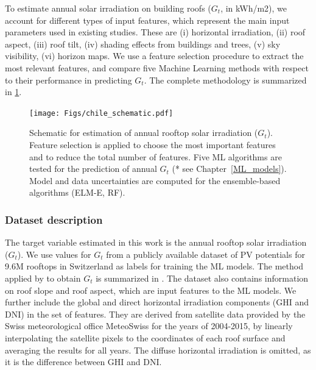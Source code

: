 To estimate annual solar irradiation on building roofs ($G_t$, in kWh/m2), we account for different types of input features, which represent the main input parameters used in existing studies. These are (i) horizontal irradiation, (ii) roof aspect, (iii) roof tilt, (iv) shading effects from buildings and trees, (v) sky visibility, (vi) horizon maps. We use a feature selection procedure to extract the most relevant features, and compare five Machine Learning methods with respect to their performance in predicting $G_t$. The complete methodology is summarized in \ref{fig:chile_schema}.

\begin{figure}[tb]
\centering\texttt{[image: Figs/chile\_schematic.pdf]}
\caption{Schematic for estimation of annual rooftop solar irradiation ($G_t$). Feature selection is applied to choose the most important features and to reduce the total number of features. Five ML algorithms are tested for the prediction of annual $G_t$ (* see Chapter~\ref{ML_models}). Model and data uncertainties are computed for the ensemble-based algorithms (ELM-E, RF). }
\label{fig:chile_schema}
\end{figure}
\subsubsection{Dataset description}

The target variable estimated in this work is the annual rooftop solar irradiation ($G_t$). We use values for $G_t$ from a publicly available dataset of PV potentials for 9.6M rooftops in Switzerland \cite{klauser_solarpotentialanalyse_2016} as labels for training the ML models. The method applied by \citet{klauser_solarpotentialanalyse_2016} to obtain $G_t$ is summarized in \cite{walch_fast_2019-1}. The dataset also contains information on roof slope and roof aspect, which are input features to the ML models. We further include the global and direct horizontal irradiation components (GHI and DNI) in the set of features. They are derived from satellite data provided by the Swiss meteorological office MeteoSwiss \cite{stockli_daily_2013} for the years of 2004-2015, by linearly interpolating the satellite pixels to the coordinates of each roof surface and averaging the results for all years. The diffuse horizontal irradiation is omitted, as it is the difference between GHI and DNI. 

